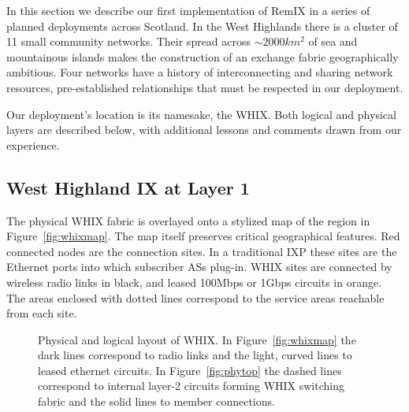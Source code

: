 
In this section we describe our first implementation of RemIX in a series of planned deployments across Scotland. In the West Highlands there
is a cluster of
11 small community networks. Their spread across $\sim 2000km^2$
of sea and mountainous islands makes the
construction of an exchange fabric geographically ambitious. Four networks have
a history of interconnecting and sharing network resources, pre-established
relationships that must be respected in our deployment.

Our deployment's location is its namesake, the \ac{WHIX}. Both logical
and physical layers are described below, with additional lessons and
comments drawn from our experience.

\subsection{West Highland IX at Layer 1}

The physical \ac{WHIX} fabric is overlayed onto a stylized map of the region in
Figure~\ref{fig:whixmap}. The map itself preserves critical geographical
features. Red connected nodes are the connection sites. In a traditional
\ac{IXP} these sites are the Ethernet ports into which subscriber \acp{AS}
plug-in. WHIX sites are connected by wireless radio links in black, and leased
100Mbps or 1Gbps circuits in orange. The areas enclosed with dotted lines
correspond to the service areas reachable from each site.
\begin{figure*}
  \centering
  \hfil %
  \caption{Physical and logical layout of \ac{WHIX}. In
  Figure~\ref{fig:whixmap} the dark lines correspond to radio links
  and the light, curved lines to leased ethernet circuits.
  In Figure~\ref{fig:phytop} the dashed lines
  correspond to internal layer-2 circuits forming \ac{WHIX}
  switching fabric and the solid lines to member connections.}
\end{figure*}

